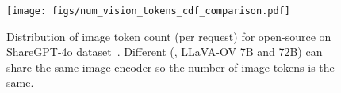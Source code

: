 \begin{figure}[!t]
    \centering
    \texttt{[image: figs/num\_vision\_tokens\_cdf\_comparison.pdf]}
    \caption{Distribution of image token count (per request) for open-source \lmms{} on ShareGPT-4o dataset~\cite{chen2024far}.
    Different \lmms{} (\eg{}, LLaVA-OV 7B and 72B) can share the same image encoder so the number of image tokens is the same.}
    \label{fig:img-token-distribution-open}
\end{figure}